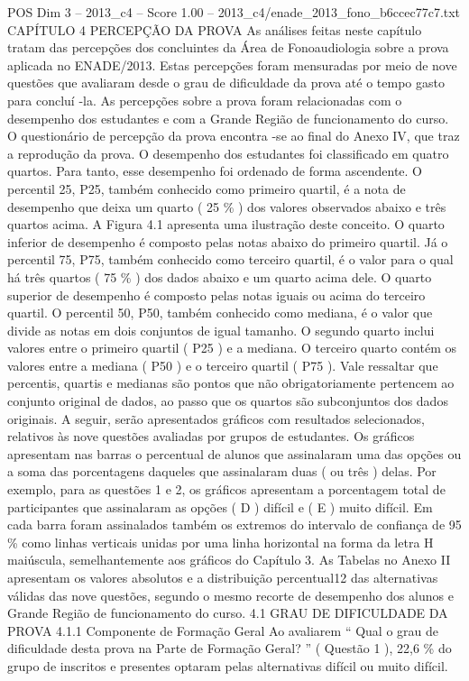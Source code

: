 \begin{textsample}{POS Dim 3 – 2013\_c4 – Score 1.00 – 2013\_c4/enade\_2013\_fono\_b6ccec77c7.txt}  \label{ex:f3_pos_167}
CAPÍTULO 4 PERCEPÇÃO DA PROVA As análises feitas neste capítulo tratam das percepções dos concluintes da Área de Fonoaudiologia sobre a prova aplicada no ENADE/2013.
Estas percepções foram mensuradas por meio de nove questões que avaliaram desde o grau de dificuldade da prova até o tempo gasto para concluí -la.
As percepções sobre a prova foram relacionadas com o desempenho dos estudantes e com a Grande Região de funcionamento do curso.
O questionário de percepção da prova encontra -se ao final do Anexo IV, que traz a reprodução da prova.
O desempenho dos estudantes foi classificado em quatro quartos.
Para tanto, esse desempenho foi ordenado de forma ascendente.
O percentil 25, P25, também conhecido como primeiro quartil, é a nota de desempenho que deixa um quarto ( 25 \% ) dos valores observados abaixo e três quartos acima.
A Figura 4.1 apresenta uma ilustração deste conceito.
O quarto inferior de desempenho é composto pelas notas abaixo do primeiro quartil.
Já o percentil 75, P75, também conhecido como terceiro quartil, é o valor para o qual há três quartos ( 75 \% ) dos dados abaixo e um quarto acima dele.
O quarto superior de desempenho é composto pelas notas iguais ou acima do terceiro quartil.
O percentil 50, P50, também conhecido como mediana, é o valor que divide as notas em dois conjuntos de igual tamanho.
O segundo quarto inclui valores entre o primeiro quartil ( P25 ) e a mediana.
O terceiro quarto contém os valores entre a mediana ( P50 ) e o terceiro quartil ( P75 ).
Vale ressaltar que percentis, quartis e medianas são pontos que não obrigatoriamente pertencem ao conjunto original de dados, ao passo que os quartos são subconjuntos dos dados originais.
A seguir, serão apresentados gráficos com resultados selecionados, relativos às nove questões avaliadas por grupos de estudantes.
Os gráficos apresentam nas barras o percentual de alunos que assinalaram uma das opções ou a soma das porcentagens daqueles que assinalaram duas ( ou três ) delas.
Por exemplo, para as questões 1 e 2, os gráficos apresentam a porcentagem total de participantes que assinalaram as opções ( D ) difícil e ( E ) muito difícil.
Em cada barra foram assinalados também os extremos do intervalo de confiança de 95 \% como linhas verticais unidas por uma linha horizontal na forma da letra H maiúscula, semelhantemente aos gráficos do Capítulo 3.
As Tabelas no Anexo II apresentam os valores absolutos e a distribuição percentual12 das alternativas válidas das nove questões, segundo o mesmo recorte de desempenho dos alunos e Grande Região de funcionamento do curso. 4.1 GRAU DE DIFICULDADE DA PROVA 4.1.1 Componente de Formação Geral Ao avaliarem “ Qual o grau de dificuldade desta prova na Parte de Formação Geral? ” ( Questão 1 ), 22,6 \% do grupo de inscritos e presentes optaram pelas alternativas difícil ou muito difícil.

\end{textsample}
